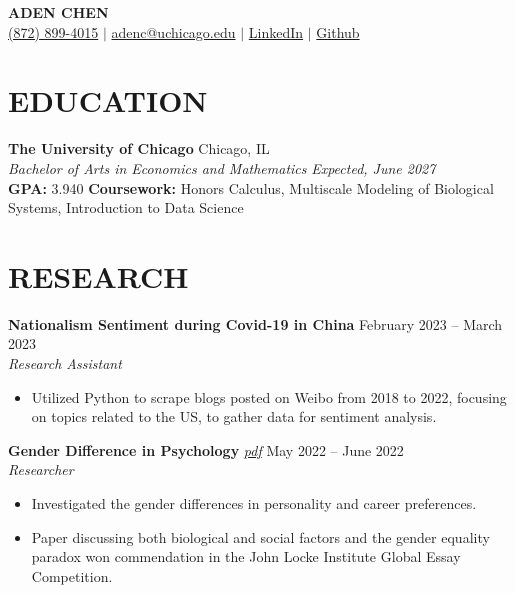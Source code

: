 \documentclass[letterpaper, 9pt]{extarticle}
\begin{document}
\pagestyle{empty}

\begin{center}
    \textbf{\Large ADEN CHEN} \\
    \href{tel:(872) 899-4015}{\faMobile\space (872) 899-4015}
    $|$
    \href{mailto:adenc@uchicago.edu}{\faAt\space adenc@uchicago.edu}
    $|$
    \href{https://www.linkedin.com/in/aden-chen-45a924221/}{\faLinkedinSquare \space LinkedIn}
    $|$
    \href{https://github.com/AdenChen27}{\faGithub\space Github}
\end{center}

\section*{EDUCATION}
\noindent
\textbf{The University of Chicago} \hfill Chicago, IL \\ 
\textit{Bachelor of Arts in Economics and Mathematics} \hfill \textit{Expected, June 2027} \\
\textbf{GPA:} 3.940 \textbf{Coursework:} Honors Calculus, Multiscale Modeling of Biological Systems, Introduction to Data Science

\section*{RESEARCH}
\noindent
\textbf{Nationalism Sentiment during Covid-19 in China} 
\hfill February 2023 -- March 2023 \\
\textit{Research Assistant} 
\begin{itemize}
    \item Utilized Python to scrape blogs posted on Weibo from 2018 to 2022, focusing on topics related to the US, to gather data for sentiment analysis.
\end{itemize}

\noindent
\textbf{Gender Difference in Psychology}
\emph{\href{https://drive.google.com/file/d/19cO9fOI9KPIAT2OV0WPENLVXvrM-A7fZ/view?usp=sharing}{\color{blue} pdf}} 
\hfill May 2022 -- June 2022 \\
\textit{Researcher} 
\begin{itemize}
    \item Investigated the gender differences in personality and career preferences. 
    \item Paper discussing both biological and social factors and the gender equality paradox won commendation in the John Locke Institute Global Essay Competition.
\end{itemize}
\end{document}
